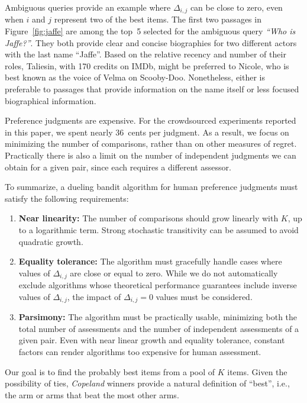 Ambiguous queries provide an example where $\Delta_{i,j}$ can be close to zero, even when $i$ and $j$ represent two of the best items. The first two passages in Figure~\ref{fig:jaffe} are among the top~5 selected for the ambiguous query {\em ``Who is Jaffe?''}. They both provide clear and concise biographies for two different actors with the last name ``Jaffe''. Based on the relative recency and number of their roles, Taliesin, with 170 credits on IMDb, might be preferred to Nicole, who is best known as the voice of Velma on Scooby-Doo. Nonetheless, either is preferable to passages that provide information on the name itself or less focused biographical information. 

Preference judgments are expensive. For the crowdsourced experiments reported in this paper, we spent nearly 36~cents per judgment. As a result, we focus on minimizing the number of comparisons, rather than on other measures of regret. Practically there is also a limit on the number of independent judgments we can obtain for a given pair, since each requires a different assessor.

To summarize, a dueling bandit algorithm for human preference judgments must satisfy the following requirements:

\begin{enumerate}
\item
{\bf Near linearity:} The number of comparisons should grow linearly with $K$, up to a logarithmic term. Strong stochastic transitivity can be assumed to avoid quadratic growth.

\item
{\bf Equality tolerance:} The algorithm must gracefully handle cases where values of $\Delta_{i,j}$ are close or equal to zero. While we do not automatically exclude algorithms whose theoretical performance guarantees include inverse values of $\Delta_{i,j}$, the impact of $\Delta_{i,j} = 0$ values must be considered.

\item
{\bf Parsimony:} The algorithm must be practically usable, minimizing both the total number of assessments and the number of independent assessments of a given pair. Even with near linear growth and equality tolerance, constant factors can render algorithms too expensive for human assessment.
\end{enumerate}

Our goal is to find the probably best items from a pool of $K$ items. Given the possibility of ties, {\em Copeland} winners provide a natural definition of ``best'', i.e., the arm or arms that beat the most other arms.

